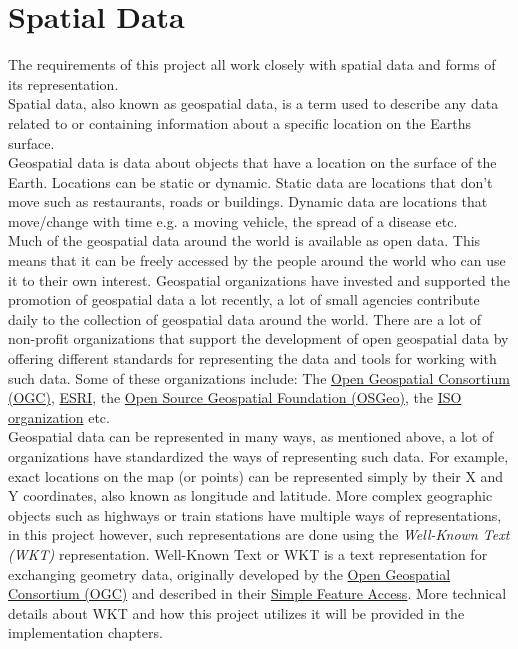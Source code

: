 \section{Spatial Data}
The requirements of this project all work closely with spatial data and forms of its representation.\\
\newline
Spatial data, also known as geospatial data, is a term used to describe any data related to or containing information
about a specific location on the Earth\textquotesingle s surface.~\cite{AboutGeoSpatialData}\\
\newline
Geospatial data is data about objects that have a location on the surface of the Earth.
Locations can be static or dynamic. Static data are locations that don't move such as restaurants, roads or buildings.
Dynamic data are locations that move/change with time e.g. a moving vehicle, the spread of a disease etc.\\
\newline
Much of the geospatial data around the world is available as open data. This means that it can be freely accessed by the people
around the world who can use it to their own interest. Geospatial organizations have invested and supported the promotion of
geospatial data a lot recently, a lot of small agencies contribute daily to the collection of geospatial data around the world.
There are a lot of non-profit organizations that support the development of open geospatial data by offering different standards
for representing the data and tools for working with such data. Some of these organizations include: The \href{https://www.ogc.org/}{Open Geospatial Consortium (OGC)},
\href{https://www.esri.com/en-us/home}{ESRI}, the \href{https://www.osgeo.org/}{Open Source Geospatial Foundation (OSGeo)},
the \href{https://www.iso.org/home.html}{ISO organization} etc.\\
\newline
Geospatial data can be represented in many ways, as mentioned above, a lot of organizations have standardized the ways of representing
such data. For example, exact locations on the map (or points) can be represented simply by their X and Y coordinates, also known as longitude and latitude.
More complex geographic objects such as highways or train stations have multiple ways of representations, in this project however, such representations
are done using the \textit{Well-Known Text (WKT)} representation. Well-Known Text or WKT is a text representation for exchanging geometry data, originally developed by
the \href{https://www.ogc.org/}{Open Geospatial Consortium (OGC)} and described in their \href{https://www.ogc.org/standards/sfa#overview}{Simple Feature Access}.
More technical details about WKT and how this project utilizes it will be provided in the implementation chapters.
\pagebreak
